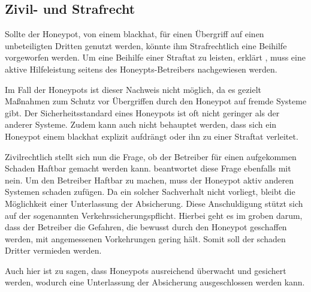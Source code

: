 \subsection{Zivil- und Strafrecht}
Sollte der Honeypot, von einem blackhat, für einen Übergriff auf einen unbeteiligten Dritten genutzt werden, könnte ihm Strafrechtlich eine Beihilfe vorgeworfen werden. Um eine Beihilfe einer Straftat zu leisten, erklärt \cite{dornseif.2012a}, muss eine aktive Hilfeleistung seitens des Honeypts-Betreibers nachgewiesen werden.

Im Fall der Honeypots ist dieser Nachweis nicht möglich, da es gezielt Maßnahmen zum Schutz vor Übergriffen durch den Honeypot auf fremde Systeme gibt. Der Sicherheitsstandard eines Honeypots ist oft nicht geringer als der anderer Systeme. Zudem kann auch nicht behauptet werden, dass sich ein Honeypot einem blackhat explizit aufdrängt oder ihn zu einer Straftat verleitet.

Zivilrechtlich stellt sich nun die Frage, ob der Betreiber für einen aufgekommen Schaden Haftbar gemacht werden kann. \cite{dornseif.2012a} beantwortet diese Frage ebenfalls mit nein. Um den Betreiber Haftbar zu machen, muss der Honeypot aktiv anderen Systemen schaden zufügen. Da ein solcher Sachverhalt nicht vorliegt, bleibt die Möglichkeit einer Unterlassung der Absicherung. Diese Anschuldigung stützt sich auf der sogenannten Verkehrssicherungspflicht. Hierbei geht es im groben darum, dass der Betreiber die Gefahren, die bewusst durch den Honeypot geschaffen werden, mit angemessenen Vorkehrungen gering hält. Somit soll der schaden Dritter vermieden werden.

Auch hier ist zu sagen, dass Honeypots ausreichend überwacht und gesichert werden, wodurch eine Unterlassung der Absicherung ausgeschlossen werden kann.